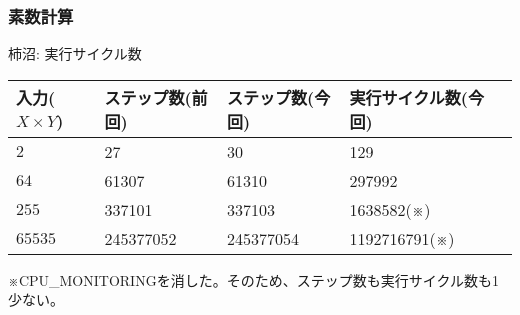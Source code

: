 \documentclass{jsarticle}
\begin{document}
\subsubsection*{素数計算}
柿沼:
実行サイクル数
\begin{table}[h]
  \begin{tabular}{|l|l|l|l|l|} \hline
    入力($X \times Y$) & ステップ数(前回) & ステップ数(今回) & 実行サイクル数(今回) \\ \hline
    $2$ & 27 & 30 & 129 \\ \hline
    $64$ & 61307 & 61310 & 297992 \\ \hline
    $255$ & 337101 & 337103 & 1638582(※) \\ \hline
    $65535$ & 245377052 & 245377054 & 1192716791(※)\\ \hline
  \end{tabular}
\end{table}

※CPU\_MONITORINGを消した。そのため、ステップ数も実行サイクル数も1少ない。
\end{document}
